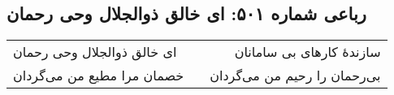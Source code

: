 \begin{center}
\section*{رباعی شماره ۵۰۱: ای خالق ذوالجلال وحی رحمان}
\label{sec:sh501}
\begin{longtable}{l p{0.5cm} r}
ای خالق ذوالجلال وحی رحمان
&&
سازندهٔ کارهای بی سامانان
\\
خصمان مرا مطیع من می‌گردان
&&
بی‌رحمان را رحیم من می‌گردان
\\
\end{longtable}
\end{center}
